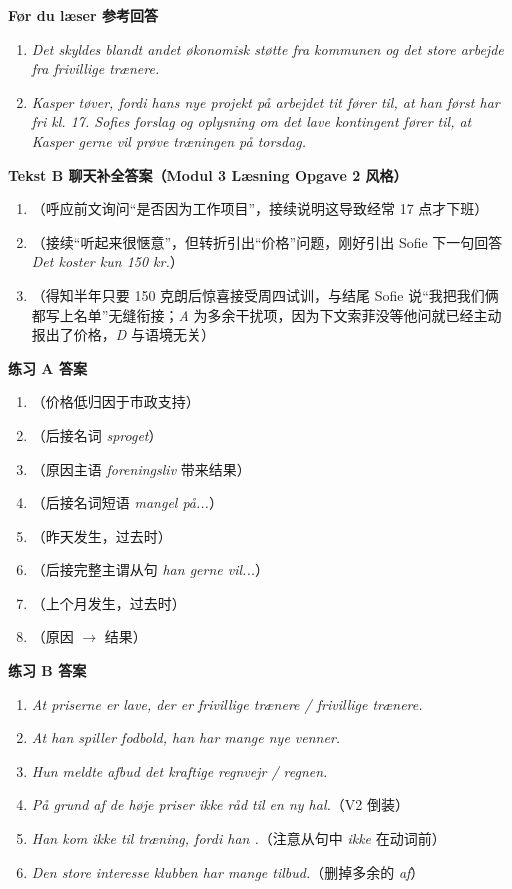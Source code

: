 \begin{answerbox}
\textbf{Før du læser 参考回答}
\begin{enumerate}
  \item \textit{Det skyldes blandt andet økonomisk støtte fra kommunen og det store arbejde fra frivillige trænere.}
  \item \textit{Kasper tøver, fordi hans nye projekt på arbejdet tit fører til, at han først har fri kl. 17. Sofies forslag og oplysning om det lave kontingent fører til, at Kasper gerne vil prøve træningen på torsdag.}
\end{enumerate}

\textbf{Tekst B 聊天补全答案（Modul 3 Læsning Opgave 2 风格）}
\begin{enumerate}
  \item[(1)] （呼应前文询问“是否因为工作项目”，接续说明这导致经常 17 点才下班）
  \item[(2)] （接续“听起来很惬意”，但转折引出“价格”问题，刚好引出 Sofie 下一句回答 \textit{Det koster kun 150 kr.}）
  \item[(3)] （得知半年只要 150 克朗后惊喜接受周四试训，与结尾 Sofie 说“我把我们俩都写上名单”无缝衔接；\textit{A} 为多余干扰项，因为下文索菲没等他问就已经主动报出了价格，\textit{D} 与语境无关）
\end{enumerate}

\textbf{练习 A 答案}
\begin{enumerate}
  \item {}（价格低归因于市政支持）
  \item {}（后接名词 \textit{sproget}）
  \item {}（原因主语 \textit{foreningsliv} 带来结果）
  \item {}（后接名词短语 \textit{mangel på...}）
  \item {}（昨天发生，过去时）
  \item {}（后接完整主谓从句 \textit{han gerne vil...}）
  \item {}（上个月发生，过去时）
  \item {}（原因 $\rightarrow$ 结果）
\end{enumerate}

\textbf{练习 B 答案}
\begin{enumerate}
  \item \textit{At priserne er lave,  der er frivillige trænere / frivillige trænere.}
  \item \textit{At han spiller fodbold,  han har mange nye venner.}
  \item \textit{Hun meldte afbud  det kraftige regnvejr / regnen.}
  \item \textit{På grund af de høje priser  ikke råd til en ny hal.}（V2 倒装）
  \item \textit{Han kom ikke til træning, fordi han .}（注意从句中 \textit{ikke} 在动词前）
  \item \textit{Den store interesse  klubben har mange tilbud.}（删掉多余的 \textit{af}）
\end{enumerate}


\end{answerbox}
